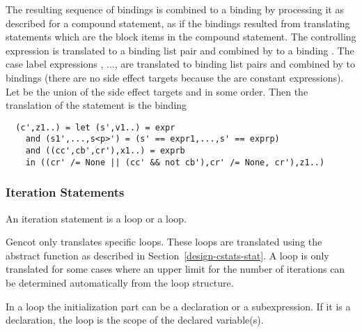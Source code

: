 The resulting sequence of bindings  is combined to a binding  by processing it as described 
for a compound statement, as if the bindings resulted from translating statements which are the block items in the compound 
statement. The controlling expression  is translated to a binding list pair and combined by  to a binding 
. The case label expressions , ...,  are translated to binding list pairs and combined by 
 to bindings  (there are no side effect targets because the  are constant expressions). 
Let  be the union of the side effect 
targets  and  in some order. Then the translation of the  statement is the binding
\begin{verbatim}
  (c',z1..) = let (s',v1..) = expr
    and (s1',...,s<p>') = (s' == expr1,...,s' == exprp)
    and ((cc',cb',cr'),x1..) = exprb
    in ((cr' /= None || (cc' && not cb'),cr' /= None, cr'),z1..)
\end{verbatim}

\subsubsection{Iteration Statements}

An iteration statement is a  loop or a  loop.

Gencot only translates specific  loops. These loops are translated using the abstract function  as described
in Section~\ref{design-cstats-stat}. A  loop is only translated for some cases where an upper limit for the number of 
iterations can be determined automatically from the loop structure.

In a  loop the initialization part can be a declaration or a subexpression. If it is a declaration, the  loop
is the scope of the declared variable(s).

